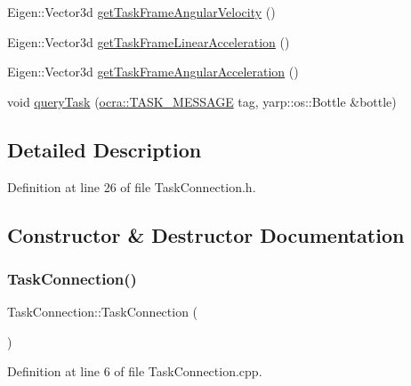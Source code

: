 \begin{DoxyCompactItemize}
Eigen\+::\+Vector3d \hyperlink{classocra__recipes_1_1TaskConnection_a57f6e6e29aa2d09bff7c9aa7e7a322f7}{get\+Task\+Frame\+Angular\+Velocity} ()
\item 
Eigen\+::\+Vector3d \hyperlink{classocra__recipes_1_1TaskConnection_a4c489ec411ea7cb026213ac53111431d}{get\+Task\+Frame\+Linear\+Acceleration} ()
\item 
Eigen\+::\+Vector3d \hyperlink{classocra__recipes_1_1TaskConnection_abae3e5305e8de9be7ccf34fdbb4d6e1a}{get\+Task\+Frame\+Angular\+Acceleration} ()
\item 
void \hyperlink{classocra__recipes_1_1TaskConnection_ae4450b3d9912471527716d7fe11e279e}{query\+Task} (\hyperlink{namespaceocra_ae51761f3980546f5ee4cbc6ebe4216dd}{ocra\+::\+T\+A\+S\+K\+\_\+\+M\+E\+S\+S\+A\+GE} tag, yarp\+::os\+::\+Bottle \&bottle)
\end{DoxyCompactItemize}


\subsection{Detailed Description}


Definition at line 26 of file Task\+Connection.\+h.



\subsection{Constructor \& Destructor Documentation}
\hypertarget{classocra__recipes_1_1TaskConnection_a57b78d2652778a07949377622e86e5d7}{}\label{classocra__recipes_1_1TaskConnection_a57b78d2652778a07949377622e86e5d7} 
\subsubsection{\texorpdfstring{Task\+Connection()}{TaskConnection()}\hspace{0.1cm}{\footnotesize\ttfamily [1/2]}}
{\footnotesize\ttfamily Task\+Connection\+::\+Task\+Connection (\begin{DoxyParamCaption}{ }\end{DoxyParamCaption})}



Definition at line 6 of file Task\+Connection.\+cpp.

